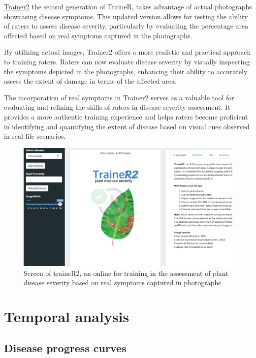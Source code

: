 \documentclass[
  letterpaper,
]{book}
\begin{document}
\href{https://delponte.shinyapps.io/traineR2/}{Trainer2} the second
generation of TraineR, takes advantage of actual photographs showcasing
disease symptoms. This updated version allows for testing the ability of
raters to assess disease severity, particularly by evaluating the
percentage area affected based on real symptoms captured in the
photographs.

By utilizing actual images, Trainer2 offers a more realistic and
practical approach to training raters. Raters can now evaluate disease
severity by visually inspecting the symptoms depicted in the
photographs, enhancing their ability to accurately assess the extent of
damage in terms of the affected area.

The incorporation of real symptoms in Trainer2 serves as a valuable tool
for evaluating and refining the skills of raters in disease severity
assessment. It provides a more authentic training experience and helps
raters become proficient in identifying and quantifying the extent of
disease based on visual cues observed in real-life scenarios.

\begin{figure}

\includegraphics[width=4.47917in,height=\textheight]{imgs/trainer2.png} \hfill{}

\caption{\label{fig-trainer2}Screen of traineR2, an online for training
in the assessment of plant disease severity based on real symptoms
captured in photographs}

\end{figure}

\part{Temporal analysis}

\hypertarget{disease-progress-curves}{%
\chapter{Disease progress curves}\label{disease-progress-curves}}
\end{document}

